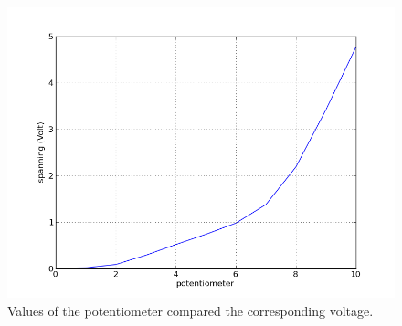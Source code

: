 \documentclass[10pt,a4paper]{article}
\begin{document}
\begin{figure}[H]
\includegraphics[width=12cm]{plot}
\caption{Values of the potentiometer compared the corresponding voltage.}
\end{figure}













\end{document}
